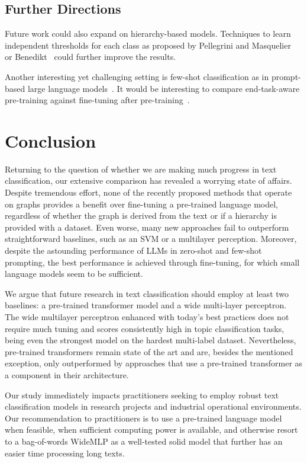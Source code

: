 \documentclass[acmsmall,nonacm]{acmart}
\newcommand{\LLMs}{LLMs\xspace}
\begin{document}
\subsection{Further Directions}
Future work could also expand on hierarchy-based models.
Techniques to learn independent thresholds for each class as proposed by
Pellegrini and Masquelier~\cite{pellegrini2021fast} or
Benedikt~\etal\cite{benedict2021sigmoidf1} could further improve the results.

Another interesting yet challenging setting is few-shot classification as in prompt-based large language models~\cite{DBLP:conf/nips/BrownMRSKDNSSAA20}.
It would be interesting to compare end-task-aware pre-training against fine-tuning after pre-training~\cite{dery2021should}. 

\section{Conclusion}
Returning to the question of whether we are making much progress in text classification, our extensive comparison has revealed a worrying state of affairs.
Despite tremendous effort, none of the recently proposed methods that operate on graphs provides a benefit over fine-tuning a pre-trained language model, regardless of whether the graph is derived from the text or if a hierarchy is provided with a dataset.
Even worse, many new approaches fail to outperform straightforward baselines, such as an SVM or a multilayer perception.
Moreover, despite the astounding performance of \LLMs in zero-shot and few-shot prompting, the best performance is achieved through fine-tuning, for which small language models seem to be sufficient.
  
We argue that future research in text classification should employ at least two baselines: a pre-trained transformer model and a wide multi-layer perceptron. The wide multilayer perceptron enhanced with today's best practices does not require much tuning and scores consistently high in topic classification tasks, being even the strongest model on the hardest multi-label dataset. Nevertheless, pre-trained transformers remain state of the art and are, besides the mentioned exception, only outperformed by approaches that use a pre-trained transformer as a component in their architecture.

Our study immediately impacts practitioners seeking to employ robust text classification models in research projects and industrial operational environments. 
Our recommendation to practitioners is to use a pre-trained language model when feasible, \ie when sufficient computing power is available, and otherwise resort to a bag-of-words WideMLP as a well-tested solid model that further has an easier time processing long texts.
\end{document}
